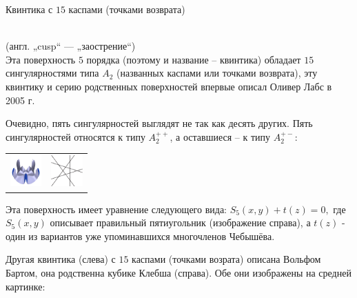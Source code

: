 \documentclass[ru]{./../../common/SurferDesc}%
\begin{document}
\footnotesize




\begin{surferPage}
  \begin{surferTitle}Квинтика с $15$ каспами (точками возврата)\end{surferTitle}\\{\footnotesize (англ. „cusp“ — „заострение“)}\\
Эта поверхность $5$ порядка (поэтому и название – квинтика) обладает $15$ сингулярностями типа $A_2$ (названных каспами или точками возврата), эту квинтику и серию родственных поверхностей впервые описал Оливер Лабс в 2005 г. 

Очевидно, пять сингулярностей выглядят не так как десять других. Пять сингулярностей относятся к типу $A_2^{++}$, а оставшиеся – к типу $A_2^{+-}$:
     \vspace*{-0.3em}
    \begin{center}
      \begin{tabular}{c@{\qquad}c}
        \includegraphics[height=1.2cm]{./../../common/images/dessins_quint_15a2}
        &
        \includegraphics[height=1.2cm]{./../../common/images/rp5.pdf}
      \end{tabular}
    \end{center}
    \vspace*{-0.3em}    
    
    Эта поверхность имеет уравнение следующего вида:
    $S_5(x,y) + t(z)=0,$
    где $S_5(x,y)$ описывает правильный пятиугольник (изображение справа), а $t(z)$ - один из вариантов уже упоминавшихся многочленов Чебышёва.

Другая квинтика (слева) с $15$ каспами (точками возрата) описана Вольфом Бартом, она родственна кубике Клебша (справа). Обе они изображены на средней картинке:


\end{surferPage}
\end{document}
